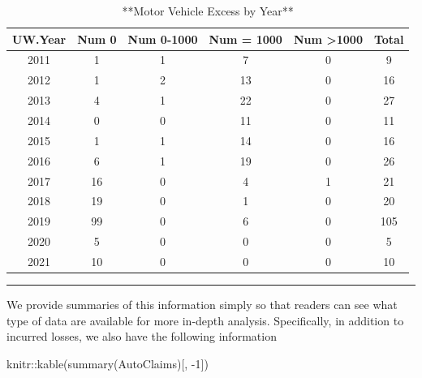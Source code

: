 \documentclass[
]{book}
\newenvironment{Shaded}{\begin{snugshade}}{\end{snugshade}}
\newcommand{\DecValTok}[1]{\textcolor[rgb]{0.00,0.00,0.81}{#1}}
\newcommand{\FunctionTok}[1]{\textcolor[rgb]{0.00,0.00,0.00}{#1}}
\newcommand{\NormalTok}[1]{#1}
\newcommand{\SpecialCharTok}[1]{\textcolor[rgb]{0.00,0.00,0.00}{#1}}
\begin{document}
\begin{table}

\caption{\label{tab:unnamed-chunk-22}**Motor Vehicle Excess by Year**}
\centering
\begin{tabular}[t]{c|c|c|c|c|c}
\hline
UW.Year & Num 0 & Num 0-1000 & Num = 1000 & Num >1000 & Total\\
\hline
2011 & 1 & 1 & 7 & 0 & 9\\
\hline
2012 & 1 & 2 & 13 & 0 & 16\\
\hline
2013 & 4 & 1 & 22 & 0 & 27\\
\hline
2014 & 0 & 0 & 11 & 0 & 11\\
\hline
2015 & 1 & 1 & 14 & 0 & 16\\
\hline
2016 & 6 & 1 & 19 & 0 & 26\\
\hline
2017 & 16 & 0 & 4 & 1 & 21\\
\hline
2018 & 19 & 0 & 1 & 0 & 20\\
\hline
2019 & 99 & 0 & 6 & 0 & 105\\
\hline
2020 & 5 & 0 & 0 & 0 & 5\\
\hline
2021 & 10 & 0 & 0 & 0 & 10\\
\hline
\end{tabular}
\end{table}

\begin{center}\rule{0.5\linewidth}{0.5pt}\end{center}

We provide summaries of this information simply so that readers can see what type of data are available for more in-depth analysis. Specifically, in addition to incurred losses, we also have the following information

\begin{Shaded}
\begin{Highlighting}[]
\NormalTok{knitr}\SpecialCharTok{::}\FunctionTok{kable}\NormalTok{(}\FunctionTok{summary}\NormalTok{(AutoClaims)[, }\SpecialCharTok{{-}}\DecValTok{1}\NormalTok{])}
\end{Highlighting}
\end{Shaded}
\end{document}
